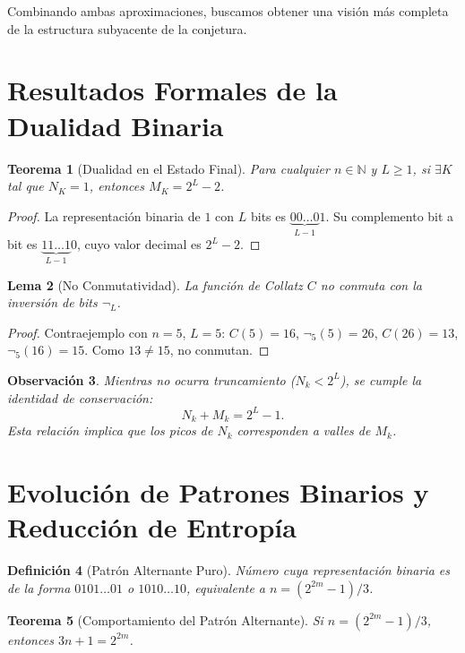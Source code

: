 \documentclass[11pt,a4paper]{article}
\newtheorem{theorem}{Teorema}[section]
\newtheorem{lemma}[theorem]{Lema}
\newtheorem{definition}[theorem]{Definición}
\newtheorem{remark}[theorem]{Observación}
\begin{document}
Combinando ambas aproximaciones, buscamos obtener una visión más completa de la estructura subyacente de la conjetura.

\section{Resultados Formales de la Dualidad Binaria}

\begin{theorem}[Dualidad en el Estado Final]
\label{thm:estado_final}
Para cualquier $n \in \mathbb{N}$ y $L \ge 1$, si $\exists K$ tal que $N_K = 1$, entonces $M_K = 2^L - 2$.
\end{theorem}

\begin{proof}
La representación binaria de $1$ con $L$ bits es $\underbrace{00\dots0}_{L-1}1$. Su complemento bit a bit es $\underbrace{11\dots1}_{L-1}0$, cuyo valor decimal es $2^L - 2$.
\end{proof}

\begin{lemma}[No Conmutatividad]
\label{lemma:no_conmuta}
La función de Collatz $C$ no conmuta con la inversión de bits $\neg_L$.
\end{lemma}

\begin{proof}
Contraejemplo con $n=5$, $L=5$: $C(5)=16$, $\neg_5(5)=26$, $C(26)=13$, $\neg_5(16)=15$. Como $13 \neq 15$, no conmutan.
\end{proof}

\begin{remark}
Mientras no ocurra truncamiento ($N_k < 2^L$), se cumple la identidad de conservación:
\[
N_k + M_k = 2^L - 1.
\]
Esta relación implica que los picos de $N_k$ corresponden a valles de $M_k$.
\end{remark}

\section{Evolución de Patrones Binarios y Reducción de Entropía}

\begin{definition}[Patrón Alternante Puro]
Número cuya representación binaria es de la forma $0101\dots01$ o $1010\dots10$, equivalente a $n = (2^{2m}-1)/3$.
\end{definition}

\begin{theorem}[Comportamiento del Patrón Alternante]
\label{thm:alternante}
Si $n = (2^{2m}-1)/3$, entonces $3n + 1 = 2^{2m}$.
\end{theorem}
\end{document}
